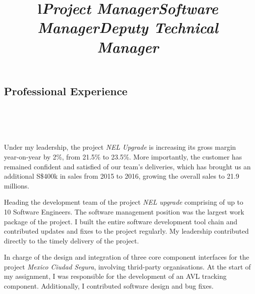 \documentclass[overlapped,line,letterpaper]{res}
\begin{document}
\begin{resume}

  \section{\bf Professional Experience}


  \begin{format}
    \title{l}\\
    \\
    \body\\
  \end{format}

  \title{\em Project Manager}
  \begin{position}
    Under my leadership, the project {\em NEL Upgrade} is increasing its gross
    margin year-on-year by 2\%, from 21.5\% to 23.5\%. More importantly, the
    customer has remained confident and satisfied of our team's deliveries,
    which has brought us an additional S\$400k in sales from 2015 to 2016,
    growing the overall sales to 21.9 millions.
  \end{position}

  \title{\em Software Manager}
  \begin{position}
    Heading the development team of the project {\em NEL upgrade} comprising of
    up to 10 Software Engineers. The software management position was the
    largest work package of the project. I built the entire software development
    tool chain and contributed updates and fixes to the project regularly. My
    leadership contributed directly to the timely delivery of the project.
  \end{position}

  \title{\em Deputy Technical Manager}
  \begin{position}
    In charge of the design and integration of three core component interfaces
    for the project {\em Mexico Ciudad Segura}, involving thrid-party
    organisations. At the start of my assignment, I was responsible for the
    development of an AVL tracking component. Additionally, I contributed
    software design and bug fixes.
  \end{position}


\end{resume}
\end{document}
